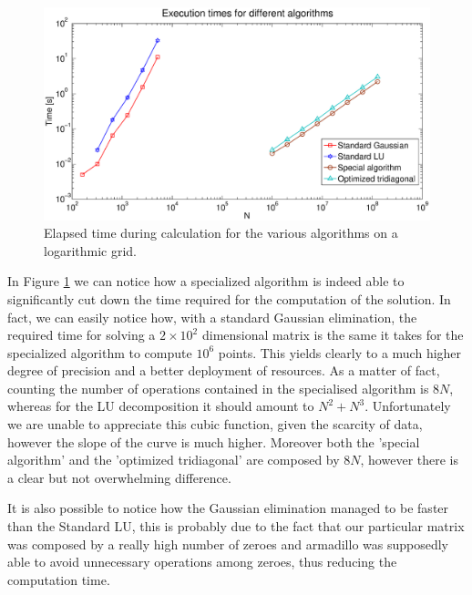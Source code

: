 \documentclass {article}
\begin{document}
\begin{figure}[H]
	\centering
	\includegraphics[width=18cm]{times.eps}
	\caption{Elapsed time during calculation for the various algorithms on a logarithmic grid.}
	\label{fig:times}
\end{figure}

In Figure \ref{fig:times} we can notice how a specialized algorithm is indeed able to significantly cut down the time required for the computation of the solution.
In fact, we can easily notice how, with a standard Gaussian elimination, the required time for solving a $2 \times 10^2$  dimensional matrix is the same it takes for the specialized algorithm to compute $10^6$ points. This yields clearly to a much higher degree of precision and a better deployment of resources.
As a matter of fact, counting the number of operations contained in the specialised algorithm is $8N$, whereas for the LU decomposition it should amount to $N^2+N^3$. Unfortunately we are unable to appreciate this cubic function, given the scarcity of data, however the slope of the curve is much higher.
Moreover both the 'special algorithm' and the 'optimized tridiagonal' are composed by $8N$, however there is a clear but not overwhelming difference. 

It is also possible to notice how the Gaussian elimination managed to be faster than the Standard LU, this is probably due to the fact that our particular matrix was composed by a really high number of zeroes and armadillo was supposedly able to avoid unnecessary operations among zeroes, thus reducing the computation time.
\end{document}
